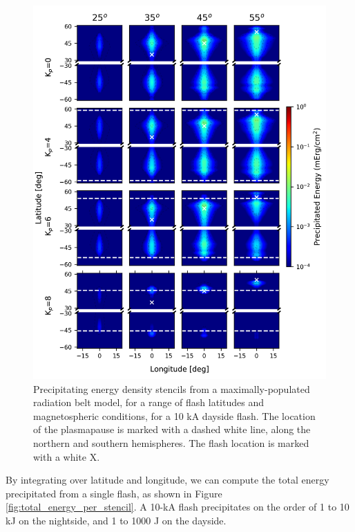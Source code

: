 \begin{figure}[]
\begin{center}
\includegraphics{figures/energy_stencils_dayside_v2.png}
\caption[Precipitating flux density stencils for a range of input latitudes and magnetospheric conditions (dayside)]{Precipitating energy density stencils from a maximally-populated radiation belt model, for a range of flash latitudes and magnetospheric conditions, for a 10 kA dayside flash. The location of the plasmapause is marked with a dashed white line, along the northern and southern hemispheres. The flash location is marked with a white X.}
\label{fig:precip_stencils_day}
\end{center}
\end{figure}

By integrating over latitude and longitude, we can compute the total energy precipitated from a single flash, as shown in Figure \ref{fig:total_energy_per_stencil}. A 10-kA flash precipitates on the order of 1 to 10 kJ on the nightside, and 1 to 1000 J on the dayside.

